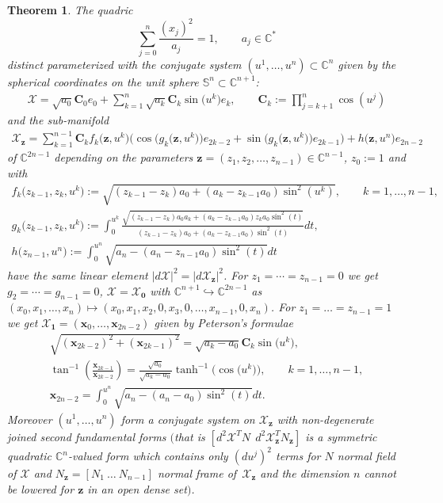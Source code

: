 \documentclass[11pt]{article}
\newtheorem{theorem}{Theorem}
\begin{document}
\begin{theorem}\label{theorem1}
The quadric
\[
\sum_{j=0}^n\frac{(x_j)^2}{a_j}=1,\qquad
a_j\in\mathbb{C}^*
\] distinct parameterized with the conjugate
system $(u^1,\dots ,u^n)\subset\mathbb{C}^n$ given by the spherical
coordinates on the unit sphere
$\mathbb{S}^n\subset\mathbb{C}^{n+1}$:
\begin{gather*}
\mathcal{X}=\sqrt{a_0}\mathbf{C}_0e_0+
\sum_{k=1}^n\sqrt{a_k}\mathbf{C}_k\sin\big(u^k\big)e_k,\qquad
\mathbf{C}_k:=\prod_{j=k+1}^n\cos(u^j)
\end{gather*}
and the sub-manifold
\begin{gather*}
\mathcal{X}_{\mathbf{z}}=\sum_{k=1}^{n-1}\mathbf{C}_kf_k\big(\mathbf{z},u^k\big)
\big(\cos\big(g_k\big(\mathbf{z},u^k\big)\big)e_{2k-2}
+\sin\big(g_k\big(\mathbf{z},u^k\big)\big)e_{2k-1}\big)+h\big(\mathbf{z},u^n\big)e_{2n-2}
\end{gather*}
 of
$\mathbb{C}^{2n-1}$ depending on the parameters
$\mathbf{z}=(z_1,z_2,\dots ,z_{n-1})\in\mathbb{C}^{n-1}$, $z_0:=1$
and with
\begin{gather}
f_k\big(z_{k-1},z_k,u^k\big):=\sqrt{(z_{k-1}-z_k)a_0+(a_k-z_{k-1}a_0)\sin^2(u^k)},\qquad k=1,\dots ,n-1,\nonumber\\
g_k\big(z_{k-1},z_k,u^k\big):=\int_0^{u^k}\frac{\sqrt{(z_{k-1}-z_k)a_0a_k+(a_k-z_{k-1}a_0)z_ka_0\sin^2(t)}}
{(z_{k-1}-z_k)a_0+(a_k-z_{k-1}a_0)\sin^2(t)}dt,\nonumber\\
h\big(z_{n-1},u^n\big):=\int_0^{u^n}\sqrt{a_n-(a_n-z_{n-1}a_0)\sin^2(t)}dt\label{eq:fgn}
\end{gather}
have the same linear element
$|d\mathcal{X}|^2{=}|d\mathcal{X}_{\mathbf{z}}|^2$. For
$z_1={\cdots}=z_{n-1}=0$ we get \mbox{$g_2={\cdots}=g_{n-1}=0$},
$\mathcal{X}=\mathcal{X}_{\mathbf{0}}$ with
$\mathbb{C}^{n+1}\hookrightarrow\mathbb{C}^{2n-1}$ as
$(x_0,x_1,\dots ,x_n)\mapsto(x_0,x_1,x_2,0,x_3,0,\dots ,x_{n-1},0,x_n)$.
For $z_1=\dots =z_{n-1}=1$ we get
$\mathcal{X}_{\mathbf{1}}=(\mathbf{x}_0,\dots ,\mathbf{x}_{2n-2})$
given by Peterson's formulae
\begin{gather}
\sqrt{(\mathbf{x}_{2k-2})^2+(\mathbf{x}_{2k-1})^2}=\sqrt{a_k-a_0}\mathbf{C}_k\sin\big(u^k\big),\nonumber\\
 \tan^{-1}\left(\frac{\mathbf{x}_{2k-1}}{\mathbf{x}_{2k-2}}\right)
=\frac{\sqrt{a_0}}{\sqrt{a_k-a_0}}\tanh^{-1}\big(\cos\big(u^k\big)\big), \qquad k=1,\dots,n-1,
\nonumber\\
\mathbf{x}_{2n-2}=\int_0^{u^n}\sqrt{a_n-(a_n-a_0)\sin^2(t)}dt.\label{eq:pfn}
\end{gather}
Moreover $(u^1,\dots ,u^n)$ form a conjugate system on
$\mathcal{X}_{\mathbf{z}}$ with non-degenerate joined second
fundamental forms $($that is $[d^2\mathcal{X}^TN\ \
d^2\mathcal{X}_{\mathbf{z}}^TN_{\mathbf{z}}]$ is a symmetric
quadratic $\mathbb{C}^n$-valued form which contains only
$(du^j)^2$ terms for $N$ normal field of $\mathcal{X}$ and
$N_{\mathbf{z}}=[N_1\   \dots   \ N_{n-1}]$ normal frame of~$\mathcal{X}_{\mathbf{z}}$ and the dimension $n$ cannot be lowered
for $\mathbf{z}$ in an open dense set$)$.
\end{theorem}
\setcounter{section}{1}
\setcounter{subsection}{0}
\setcounter{subsubsection}{0}
\setcounter{equation}{2}
\end{document}
